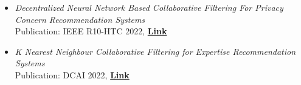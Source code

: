 \begin{itemize}[noitemsep, left=0pt]
    \item \emph{Decentralized Neural Network Based Collaborative Filtering For Privacy Concern Recommendation Systems} \\
    Publication: IEEE R10-HTC 2022, \textbf{{\href{https://doi.org/10.1109/R10-HTC54060.2022.9929681}{Link}}}

    \item \emph{K Nearest Neighbour Collaborative Filtering for Expertise Recommendation Systems} \\
    Publication: DCAI 2022, \textbf{{\href{https://doi.org/10.1007/978-3-031-20859-1_19}{Link}}}
\end{itemize}
\vspace{-13pt}